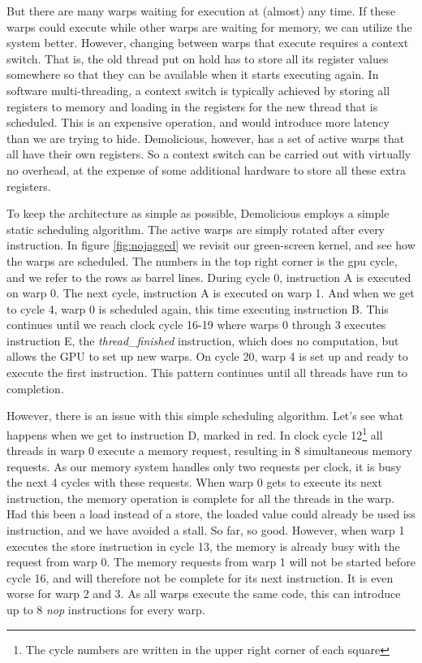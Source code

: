 \documentclass[../main/report.tex]{subfiles}
\begin{document}
But there are many warps waiting for execution at (almost) any time.
If these warps could execute while other warps are waiting for memory, we can utilize the system better.
However, changing between warps that execute requires a context switch.
That is, the old thread put on hold has to store all its register values somewhere so that they can be available when it starts executing again.
In software multi-threading, a context switch is typically achieved by storing all registers to memory and loading in the registers for the new thread that is scheduled.
This is an expensive operation, and would introduce more latency than we are trying to hide.
Demolicious, however, has a set of active warps that all have their own registers.
So a context switch can be carried out with virtually no overhead, at the expense of some additional hardware to store all these extra registers.

To keep the architecture as simple as possible, Demolicious employs a simple static scheduling algorithm.
The active warps are simply rotated after every instruction. In figure \ref{fig:nojagged} we revisit our green-screen kernel, and see how the warps are scheduled.
The numbers in the top right corner is the gpu cycle, and we refer to the rows as barrel lines.
During cycle 0, instruction A is executed on warp 0.
The next cycle, instruction A is executed on warp 1.
And when we get to cycle 4, warp 0 is scheduled again, this time executing instruction B.
This continues until we reach clock cycle 16-19 where warps 0 through 3 executes instruction E, the \emph{thread\_finished} instruction, which does no computation, but allows the GPU to set up new warps.
On cycle 20, warp 4 is set up and ready to execute the first instruction.
This pattern continues until all threads have run to completion.

However, there is an issue with this simple scheduling algorithm.
Let's see what happens when we get to instruction D, marked in red.
In clock cycle 12\footnote{The cycle numbers are written in the upper right corner of each square} all threads in warp 0 execute a memory request, resulting in 8 simultaneous memory requests.
As our memory system handles only two requests per clock,
it is busy the next 4 cycles with these requests.
When warp 0 gets to execute its next instruction, the memory operation is complete for all the threads in the warp.
Had this been a load instead of a store, the loaded value could already be used iss instruction, and we have avoided a stall.
So far, so good.
However, when warp 1 executes the store instruction in cycle 13, the memory is already busy with the request from warp 0.
The memory requests from warp 1 will not be started before cycle 16, and will therefore not be complete for its next instruction.
It is even worse for warp 2 and 3. As all warps execute the same code, this can introduce up to 8 \emph{nop} instructions for every warp.
\end{document}
